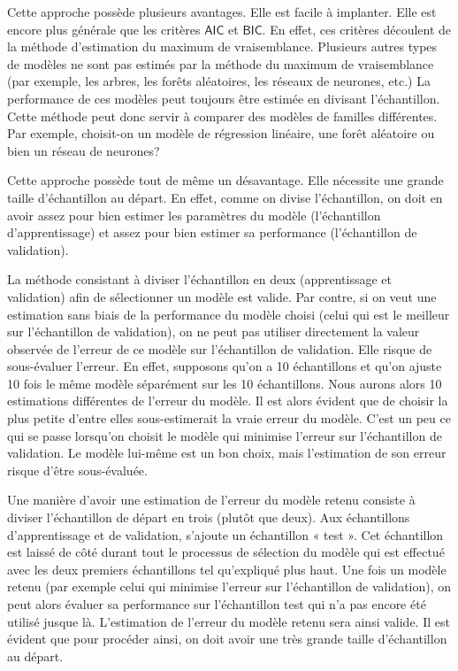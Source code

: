 \documentclass[
]{book}
\theoremstyle{definition}
\theoremstyle{definition}
\theoremstyle{definition}
\theoremstyle{remark}
\begin{document}
Cette approche possède plusieurs avantages. Elle est facile à implanter. Elle est encore plus générale que les critères \(\mathsf{AIC}\) et \(\mathsf{BIC}\). En effet, ces critères découlent de la méthode d'estimation du maximum de vraisemblance. Plusieurs autres types de modèles ne sont pas estimés par la méthode du maximum de vraisemblance (par exemple, les arbres, les forêts aléatoires, les réseaux de neurones, etc.) La performance de ces modèles peut toujours être estimée en divisant l'échantillon. Cette méthode peut donc servir à comparer des modèles de familles différentes. Par exemple, choisit-on un modèle de régression linéaire, une forêt aléatoire ou bien un réseau de neurones?

Cette approche possède tout de même un désavantage. Elle nécessite une grande taille d'échantillon au départ. En effet, comme on divise l'échantillon, on doit en avoir assez pour bien estimer les paramètres du modèle (l'échantillon d'apprentissage) et assez pour bien estimer sa performance (l'échantillon de validation).

La méthode consistant à diviser l'échantillon en deux (apprentissage et validation) afin de sélectionner un modèle est valide. Par contre, si on veut une estimation sans biais de la performance du modèle choisi (celui qui est le meilleur sur l'échantillon de validation), on ne peut pas utiliser directement la valeur observée de l'erreur de ce modèle sur l'échantillon de validation. Elle risque de sous-évaluer l'erreur. En effet, supposons qu'on a 10 échantillons et qu'on ajuste 10 fois le même modèle séparément sur les 10 échantillons. Nous aurons alors 10 estimations différentes de l'erreur du modèle. Il est alors évident que de choisir la plus petite d'entre elles sous-estimerait la vraie erreur du modèle. C'est un peu ce qui se passe lorsqu'on choisit le modèle qui minimise l'erreur sur l'échantillon de validation. Le modèle lui-même est un bon choix, mais l'estimation de son erreur risque d'être sous-évaluée.

Une manière d'avoir une estimation de l'erreur du modèle retenu consiste à diviser l'échantillon de départ en trois (plutôt que deux). Aux échantillons d'apprentissage et de validation, s'ajoute un échantillon « test ». Cet échantillon est laissé de côté durant tout le processus de sélection du modèle qui est effectué avec les deux premiers échantillons tel qu'expliqué plus haut. Une fois un modèle retenu (par exemple celui qui minimise l'erreur sur l'échantillon de validation), on peut alors évaluer sa performance sur l'échantillon test qui n'a pas encore été utilisé jusque là. L'estimation de l'erreur du modèle retenu sera ainsi valide. Il est évident que pour procéder ainsi, on doit avoir une très grande taille d'échantillon au départ.
\end{document}
